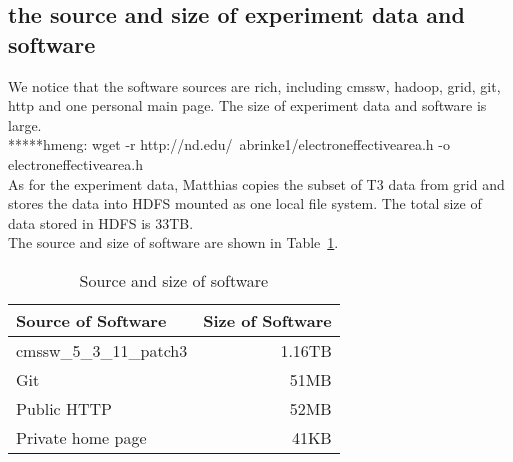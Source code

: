 \documentclass{article}
\begin{document}
\subsection{the source and size of experiment data and software}
We notice that the software sources are rich, including cmssw, hadoop, grid, git, http and one personal main page. The size of experiment data and software is large.\\

*****hmeng: wget -r http://nd.edu/~abrinke1/electroneffectivearea.h -o electroneffectivearea.h\\ 

As for the experiment data, Matthias copies the subset of T3 data from grid and stores the data into HDFS mounted as one local file system. The total size of data stored in HDFS is 33TB.\\

The source and size of software are shown in Table~\ref{table:software-source-size}.\\

\begin{table}
    \centering
    \begin{tabular}{|l|r|}
        \hline
        Source of Software & Size of Software \\ \hline
        cmssw\_5\_3\_11\_patch3 & 1.16TB \\ \hline
        Git & 51MB \\ \hline
        Public HTTP & 52MB \\ \hline
        Private home page & 41KB \\ \hline
    \end{tabular}
    \caption{Source and size of software}
    \label{table:software-source-size}
\end{table}
\end{document}
